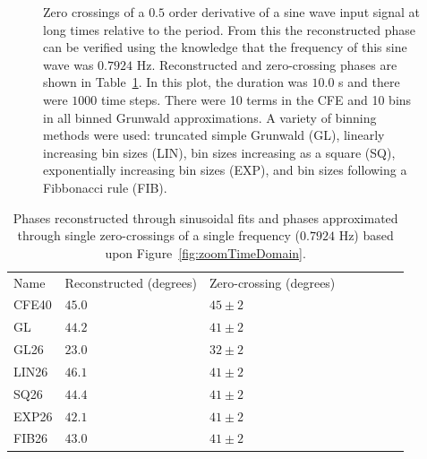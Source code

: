 \begin{figure}
\begin{center}
\end{center}
\caption{Zero crossings of a $0.5$ order derivative of a sine wave input signal 
at long times relative to the period. From this the reconstructed
  phase can be verified using the knowledge that the frequency of this
  sine wave was $0.7924$ Hz. Reconstructed and zero-crossing phases
  are shown in Table~\ref{tab:phaseRecon}. In this plot, the duration
  was $10.0$ s and there were $1000$ time steps. There were 10 terms
  in the CFE and 10 bins in all binned Grunwald approximations. A
  variety of binning methods were used: truncated simple Grunwald
  (GL), linearly increasing bin sizes (LIN), bin sizes increasing as a
  square (SQ), exponentially increasing bin sizes (EXP), and bin sizes
  following a Fibbonacci rule (FIB).}
\label{fig:timeDomain}
\end{figure}

\begin{table}
\begin{tabular}{llllllll}
\hline
Name &Reconstructed (degrees) &Zero-crossing (degrees)\\ CFE40 &$45.0$
&$45\pm 2$\\ GL &$44.2$ &$41\pm 2$\\ GL26 &$23.0$ &$32\pm 2$\\ LIN26
&$46.1$ &$41\pm 2$\\ SQ26 &$44.4$ &$41\pm 2$\\ EXP26 &$42.1$ &$41\pm
2$\\ FIB26 &$43.0$ &$41\pm 2$\\
\hline
\end{tabular}
\label{tab:phaseRecon}
\caption{Phases reconstructed through sinusoidal fits and phases approximated through single zero-crossings of a single frequency ($0.7924$ Hz) based upon Figure~\ref{fig:zoomTimeDomain}.}
\end{table}

